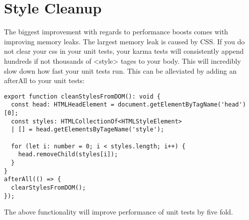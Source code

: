 \section{ Style Cleanup }
The biggest improvement with regards to performance boosts comes with improving
memory leaks. The largest memory leak is caused by CSS. If you do not clear
your css in your unit tests, your karma tests will consistently append hundreds
if not thousands of <style> tages to your body. This will incredibly slow down
how fast your unit tests run. This can be alleviated by adding an afterAll to
your unit tests:
\begin{lstlisting}
export function cleanStylesFromDOM(): void {
  const head: HTMLHeadElement = document.getElementByTagName('head')[0];
  const styles: HTMLCollectionOf<HTMLStyleElement>
  | [] = head.getElementsByTageName('style');

  for (let i: number = 0; i < styles.length; i++) {
    head.removeChild(styles[i]);
  }
}
afterAll(() => {
  clearStylesFromDOM();
});
\end{lstlisting}

The above functionality will improve performance of unit tests by five fold.
